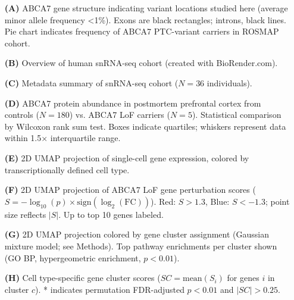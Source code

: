 \begin{itemize}
    \item[\textbf{(A)}] ABCA7 gene structure indicating variant locations studied here (average minor allele frequency <1\%). Exons are black rectangles; introns, black lines. Pie chart indicates frequency of ABCA7 PTC-variant carriers in ROSMAP cohort.
    \item[\textbf{(B)}] Overview of human snRNA-seq cohort (created with BioRender.com).
    \item[\textbf{(C)}] Metadata summary of snRNA-seq cohort ($N=36$ individuals).
    \item[\textbf{(D)}] ABCA7 protein abundance in postmortem prefrontal cortex from controls ($N=180$) vs. ABCA7 LoF carriers ($N=5$). Statistical comparison by Wilcoxon rank sum test. Boxes indicate quartiles; whiskers represent data within 1.5× interquartile range.
    \item[\textbf{(E)}] 2D UMAP projection of single-cell gene expression, colored by transcriptionally defined cell type.
    \item[\textbf{(F)}] 2D UMAP projection of ABCA7 LoF gene perturbation scores ($S = -\log_{10}(p)\times\text{sign}(\log_2(\text{FC}))$). Red: $S>1.3$, Blue: $S<-1.3$; point size reflects $|S|$. Up to top 10 genes labeled.
    \item[\textbf{(G)}] 2D UMAP projection colored by gene cluster assignment (Gaussian mixture model; see Methods). Top pathway enrichments per cluster shown (GO BP, hypergeometric enrichment, $p<0.01$).
    \item[\textbf{(H)}] Cell type-specific gene cluster scores ($SC=\text{mean}(S_i)$ for genes $i$ in cluster $c$). * indicates permutation FDR-adjusted $p<0.01$ and $|SC|>0.25$.
\end{itemize}